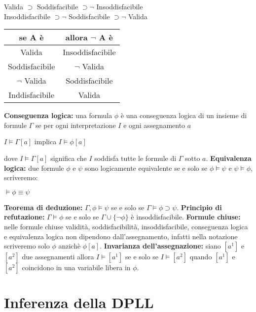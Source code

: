 \documentclass[../main.tex]{subfiles}
\newcommand{\spazio}{\vspace{1em} \newline}
\begin{document}
   \begin{center}
      Valida $\supset$ Soddisfacibile $\supset \lnot$ Insoddisfacibile\\
      \vspace{4ex}
      Insoddisfacibile $\supset \lnot$ Soddisfacibile $\supset \lnot$ Valida\\
      \vspace{4ex}
      \begin{tabular}{c c}
         \hline
         se A è & allora $\lnot$ A è\\
         \hline
         \hline
         Valida & Insoddisfacibile\\
         Soddisfacibile & $\lnot$ Valida\\
         $\lnot$ Valida & Soddisfacibile\\
         Inddisfacibile & Valida
      \end{tabular}
   \end{center}
   \textbf{Conseguenza logica:} una formula $\phi$ è una conseguenza logica di un insieme di formule $\Gamma$  se per ogni interpretazione $I$ e ogni assegnamento $a$
   \begin{center}
      $I \models \Gamma [a]$ implica $I \models \phi [a]$
   \end{center}
   dove $I \models \Gamma [a]$ significa che $I$ soddisfa tutte le formule di $\Gamma$ sotto $a$.
   \spazio
   \textbf{Equivalenza logica:} due formule $\phi$ e $\psi$ sono logicamente equivalente se e solo se $\phi \models \psi$ e $\psi \models \phi$, scriveremo:
   \begin{center}
      $\models \phi \equiv \psi$
   \end{center}
   \textbf{Teorema di deduzione:} $\Gamma , \phi \models \psi$ se e solo se $\Gamma \models \phi \supset \psi$.
   \spazio
   \textbf{Principio di refutazione:} $\Gamma \models \phi$ se e solo se $\Gamma \cup \{ \lnot \phi \}$ è insoddisfacibile.
   \spazio
   \textbf{Formule chiuse:} nelle formule chiuse validità, soddisfacibilità, insoddisfacibile, conseguenza logica e equivalenza logica non dipendono dall'assegnamento, infatti nella notazione scriveremo solo $\phi$ anzichè $\phi[a]$.
   \spazio
   \textbf{Invarianza dell'assegnazione:} siano $[a^1]$ e $[a^2]$ due assegnamenti allora $I \models [a^1]$ se e solo se $I \models [a^2]$ quando $[a^1]$ e $[a^2]$ coincidono in una variabile libera in $\phi$.

   \chapter{Inferenza della DPLL}
\end{document}
